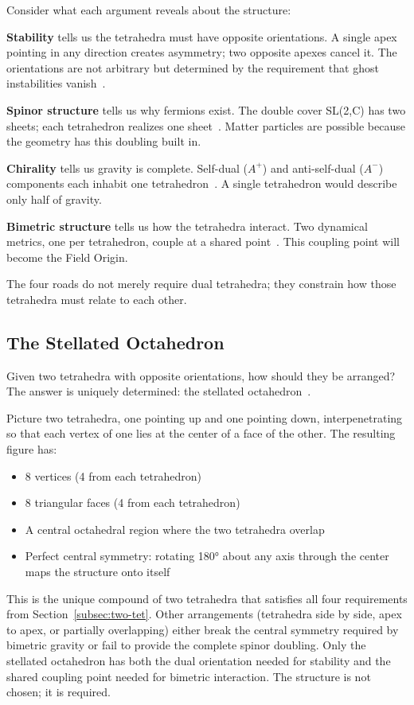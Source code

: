 \documentclass[aps,prd,preprint,superscriptaddress,showpacs,preprintnumbers,amsmath,amssymb,nofootinbib]{revtex4-2}
\begin{document}
Consider what each argument reveals about the structure:

\textbf{Stability} tells us the tetrahedra must have opposite orientations. A single apex pointing in any direction creates asymmetry; two opposite apexes cancel it. The orientations are not arbitrary but determined by the requirement that ghost instabilities vanish~\cite{alexander2014}.

\textbf{Spinor structure} tells us why fermions exist. The double cover SL(2,C) has two sheets; each tetrahedron realizes one sheet~\cite{weinberg1995,geroch1968}. Matter particles are possible because the geometry has this doubling built in.

\textbf{Chirality} tells us gravity is complete. Self-dual ($A^+$) and anti-self-dual ($A^-$) components each inhabit one tetrahedron~\cite{ashtekar1986}. A single tetrahedron would describe only half of gravity.

\textbf{Bimetric structure} tells us how the tetrahedra interact. Two dynamical metrics, one per tetrahedron, couple at a shared point~\cite{hassan2012}. This coupling point will become the Field Origin.

The four roads do not merely require dual tetrahedra; they constrain how those tetrahedra must relate to each other.

\subsection{The Stellated Octahedron}
\label{subsec:stellated}

Given two tetrahedra with opposite orientations, how should they be arranged? The answer is uniquely determined: the stellated octahedron~\cite{coxeter1973}.

Picture two tetrahedra, one pointing up and one pointing down, interpenetrating so that each vertex of one lies at the center of a face of the other. The resulting figure has:
\begin{itemize}
\item 8 vertices (4 from each tetrahedron)
\item 8 triangular faces (4 from each tetrahedron)
\item A central octahedral region where the two tetrahedra overlap
\item Perfect central symmetry: rotating 180° about any axis through the center maps the structure onto itself
\end{itemize}

This is the unique compound of two tetrahedra that satisfies all four requirements from Section~\ref{subsec:two-tet}. Other arrangements (tetrahedra side by side, apex to apex, or partially overlapping) either break the central symmetry required by bimetric gravity or fail to provide the complete spinor doubling. Only the stellated octahedron has both the dual orientation needed for stability and the shared coupling point needed for bimetric interaction. The structure is not chosen; it is required.
\end{document}
